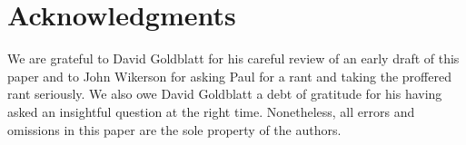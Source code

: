 \documentclass[10]{article}
\begin{document}
\section{Acknowledgments}
\label{sec:Acknowledgments}

We are grateful to David Goldblatt for his careful review of an early
draft of this paper and to John Wikerson for asking Paul for a rant and
taking the proffered rant seriously.
We also owe David Goldblatt a debt of gratitude for his having asked
an insightful question at the right time.
Nonetheless, all errors and omissions in this paper are the sole property
of the authors.










\end{document}
